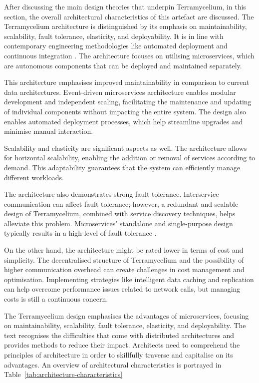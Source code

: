 \documentclass[review]{elsarticle}
\begin{document}
After discussing the main design theories that underpin Terramycelium, in this section, the overall architectural characteristics of this artefact are discussed. The Terramycelium architecture is distinguished by its emphasis on maintainability, scalability, fault tolerance, elasticity, and deployability. It is in line with contemporary engineering methodologies like automated deployment and continuous integration \cite{Ford2021SoftwareArchitecture}. The architecture focuses on utilising microservices, which are autonomous components that can be deployed and maintained separately.

This architecture emphasises improved maintainability in comparison to current data architectures. Event-driven microservices architecture enables modular development and independent scaling, facilitating the maintenance and updating of individual components without impacting the entire system. The design also enables automated deployment processes, which help streamline upgrades and minimise manual interaction.



Scalability and elasticity are significant aspects as well. The architecture allows for horizontal scalability, enabling the addition or removal of services according to demand. This adaptability guarantees that the system can efficiently manage different workloads.

The architecture also demonstrates strong fault tolerance. Interservice communication can affect fault tolerance; however, a redundant and scalable design of Terramycelium, combined with service discovery techniques, helps alleviate this problem. Microservices' standalone and single-purpose design typically results in a high level of fault tolerance \cite{MStodaytomorrow}.

On the other hand, the architecture might be rated lower in terms of cost and simplicity. The decentralised structure of Terramycelium and the possibility of higher communication overhead can create challenges in cost management and optimisation. Implementing strategies like intelligent data caching and replication can help overcome performance issues related to network calls, but managing costs is still a continuous concern.

The Terramycelium design emphasises the advantages of microservices, focusing on maintainability, scalability, fault tolerance, elasticity, and deployability. The text recognises the difficulties that come with distributed architectures and provides methods to reduce their impact. Architects need to comprehend the principles of architecture in order to skillfully traverse and capitalise on its advantages. An overview of architectural characteristics is portrayed in Table~\ref{tab:architecture-characteristics}
\end{document}
